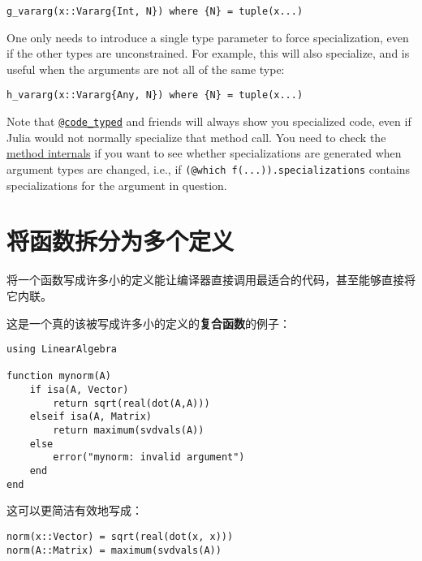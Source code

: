 \begin{verbatim}
g_vararg(x::Vararg{Int, N}) where {N} = tuple(x...)
\end{verbatim}



One only needs to introduce a single type parameter to force specialization, even if the other types are unconstrained. For example, this will also specialize, and is useful when the arguments are not all of the same type:




\begin{verbatim}
h_vararg(x::Vararg{Any, N}) where {N} = tuple(x...)
\end{verbatim}



Note that \hyperlink{6823997547688846780}{\texttt{@code\_typed}} and friends will always show you specialized code, even if Julia would not normally specialize that method call. You need to check the \hyperlink{5484310955311811443}{method internals} if you want to see whether specializations are generated when argument types are changed, i.e., if \texttt{(@which f(...)).specializations} contains specializations for the argument in question.



\hypertarget{5154687489987486672}{}


\section{将函数拆分为多个定义}



将一个函数写成许多小的定义能让编译器直接调用最适合的代码，甚至能够直接将它内联。



这是一个真的该被写成许多小的定义的\textbf{复合函数}的例子：




\begin{verbatim}
using LinearAlgebra

function mynorm(A)
    if isa(A, Vector)
        return sqrt(real(dot(A,A)))
    elseif isa(A, Matrix)
        return maximum(svdvals(A))
    else
        error("mynorm: invalid argument")
    end
end
\end{verbatim}



这可以更简洁有效地写成：




\begin{verbatim}
norm(x::Vector) = sqrt(real(dot(x, x)))
norm(A::Matrix) = maximum(svdvals(A))
\end{verbatim}



